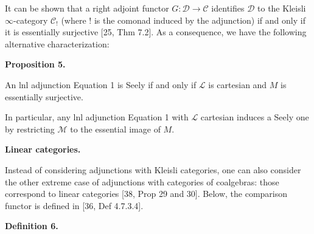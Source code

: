  
 
 
It can be shown that a right adjoint functor $G:\mathcal{D}\to\mathcal{C}$ identifies ${\mathcal{D}}$ to the Kleisli $\infty$-category ${\mathcal{C}}_{\mathop{!}}$ (where $\mathop{!}$ is the comonad induced by the adjunction) if and only if it is essentially surjective [25, Thm 7.2]. As a consequence, we have the following alternative characterization:\par
 
 
 
\par\medskip\noindent\textbf{Proposition 5.}\par
 
 
An lnl adjunction Equation 1 is Seely if and only if ${\mathcal{L}}$ is cartesian and $M$ is essentially surjective.\par
 
 
 
 
In particular, any lnl adjunction Equation 1 with ${\mathcal{L}}$ cartesian induces a Seely one by restricting ${\mathcal{M}}$ to the essential image of $M$.\par
 
 
 
 
\par\medskip\noindent\textbf{Linear categories.}\par
 
 
Instead of considering adjunctions with Kleisli categories, one can also consider the other extreme case of adjunctions with categories of coalgebras: those correspond to linear categories [38, Prop 29 and 30]. Below, the comparison functor is defined in [36, Def 4.7.3.4].\par
 
 
 
\par\medskip\noindent\textbf{Definition 6.}\par
 
